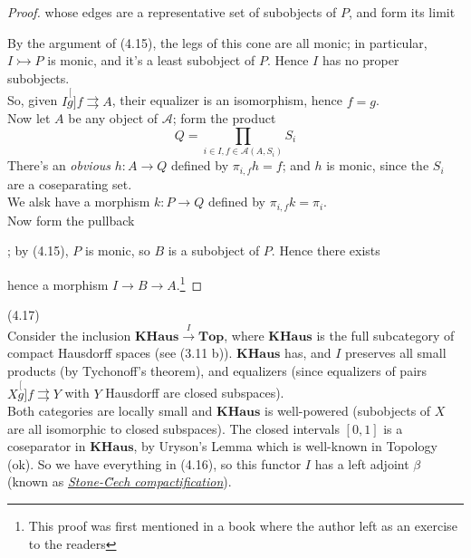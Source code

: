 \documentclass[a4paper]{article}
\begin{document}
\begin{thm}
\begin{proof}
        whose edges are a representative set of subobjects of $P$, and form its limit


        By the argument of (4.15), the legs of this cone are all monic; in particular, $I \rightarrowtail P$ is monic, and it's a least subobject of $P$. Hence $I$ has no proper subobjects.\\
        So, given $I \stackrel[g]{f}{\rightrightarrows} A$, their equalizer is an isomorphism, hence $f=g$.\\
        Now let $A$ be any object of $\mathcal{A}$; form the product
        $$Q = \prod_{i \in I, f \in \mathcal{A}(A,S_i)} S_i$$
        There's an \emph{obvious} $h:A \to Q$ defined by $\pi_{i,f} h = f$; and $h$ is monic, since the $S_i$ are a coseparating set.\\
        We alsk have a morphism $k:P \to Q$ defined by $\pi_{i,f} k = \pi_i$.\\
        Now form the pullback 
        ; by (4.15), $P$ is monic, so $B$ is a subobject of $P$. Hence there exists 
        hence a morphism $I \to B \to A$.\footnote{This proof was first mentioned in a book where the author left as an exercise to the readers}
    \end{proof}
\end{thm}

\begin{eg} (4.17)\\
    Consider the inclusion $\mathbf{KHaus} \xrightarrow{I} \mathbf{Top}$, where $\mathbf{KHaus}$ is the full subcategory of compact Hausdorff spaces (see (3.11 b)). $\mathbf{KHaus}$ has, and $I$ preserves all small products (by Tychonoff's theorem), and equalizers (since equalizers of pairs $X\stackrel[g]{f}{\rightrightarrows} Y$ with $Y$ Hausdorff are closed subspaces).\\
    Both categories are locally small and $\mathbf{KHaus}$ is well-powered (subobjects of $X$ are all isomorphic to closed subspaces). The closed intervals $[0,1]$ is a coseparator in $\mathbf{KHaus}$, by Uryson's Lemma which is well-known in Topology (ok). So we have everything in (4.16), so this functor $I$ has a left adjoint $\beta$ (known as \href{https://en.wikipedia.org/wiki/Stone%E2%80%93%C4%8Cech_compactification}{\emph{Stone-\u{C}ech compactification}}).
\end{eg}
\end{document}
